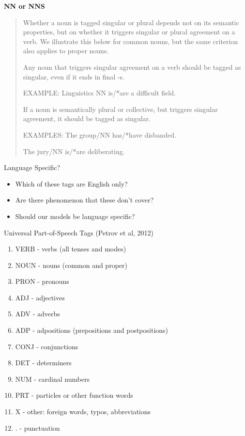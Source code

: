 \documentclass{beamer}
\begin{document}
\begin{frame}


\textbf{NN or NNS}

\begin{quote}
  Whether a noun is tagged singular or plural depends not on its
  semantic properties, but on whether it triggers singular or plural
  agreement on a verb. We illustrate this below for common nouns, but
  the same criterion also applies to proper nouns.

Any noun that triggers singular agreement on a verb should be tagged as singular, even if it ends in final -s.

\air

\textnormal{EXAMPLE: Linguistics NN is/*are a difficult field.}

\air
If a noun is semantically plural or collective, but triggers singular agreement, it should be tagged as
singular.

\air
\textnormal{EXAMPLES: The group/NN has/*have disbanded.}

\textnormal{The jury/NN is/*are deliberating.}

\end{quote}

\end{frame}


\begin{frame}{Language Specific?}
  \begin{itemize}
  \item Which of these tags are English only?
    \air

  \item Are there  phenomenon that these don't cover?
    \air

  \item Should our models be language specific?
  \end{itemize}
\end{frame}

\begin{frame}{Universal Part-of-Speech Tags (Petrov et al, 2012)}

  \begin{enumerate}
  \item VERB - verbs (all tenses and modes)
  \item NOUN - nouns (common and proper)
  \item PRON - pronouns
  \item ADJ - adjectives
  \item ADV - adverbs
  \item ADP - adpositions (prepositions and postpositions)
  \item CONJ - conjunctions
  \item DET - determiners
  \item NUM - cardinal numbers
  \item PRT - particles or other function words
  \item X - other: foreign words, typos, abbreviations
  \item . - punctuation
\end{enumerate}
\end{frame}
\end{document}
